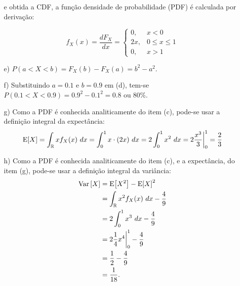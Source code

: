 \begin{itemize}
    e obtida a CDF, a função densidade de probabilidade (PDF) é calculada por derivação:

    \begin{minipage}{.5\textwidth}
        \begin{equation}
            f_X(x) = \frac{dF_X}{dx} = 
            \begin{cases}
                0, & x < 0 \\
                2x, & 0 \leq x \leq 1 \\
                0, & x > 1     
            \end{cases}
        \end{equation}
    \end{minipage}
    \begin{minipage}{.5\textwidth}
        \centering
    \end{minipage}
    
    \item [e)]
    $P(a < X < b) = F_X(b) - F_X(a) = b^2 - a^2$.
    
    \item [f)] 
    Substituindo $a=0.1$ e $b=0.9$ em (d), tem-se
    $P(0.1 < X < 0.9) = 0.9^2 - 0.1^2 = 0.8$ ou 80\%.
    
    \item [g)] 
    Como a PDF é conhecida analiticamente do item (c), pode-se usar a definição integral da expectância:
    \begin{equation}
        \mathrm{E}\!\left[X\right] 
        = \int_\mathbb{R} x f_X(x) \ dx
        = \int_0^1 x \cdot (2x) \ dx 
        = 2 \int_0^1 x^2 \ dx 
        = 2 \frac{x^3}{3}\bigg|_0^1 
        = \frac23
    \end{equation}
    
    \item [h)] 
    Como a PDF é conhecida analiticamente do item (c), e a expectância, do item (g),
    pode-se usar a definição integral da variância:
    \begin{align}
        \mathrm{Var}\left[X\right] 
        &= \mathrm{E}\!\left[X^2\right] - \mathrm{E}\!\left[X\right]^2 \\
        &= \int_\mathbb{R} x^2 f_X(x) \ dx - \frac49 \\
        &= 2\int_0^1 x^3 \ dx - \frac49 \\
        &= 2\frac14 x^4\bigg|_0^1 - \frac49 \\
        &= \frac12 - \frac49 \\
        &= \frac{1}{18}.
    \end{align}
\end{itemize}